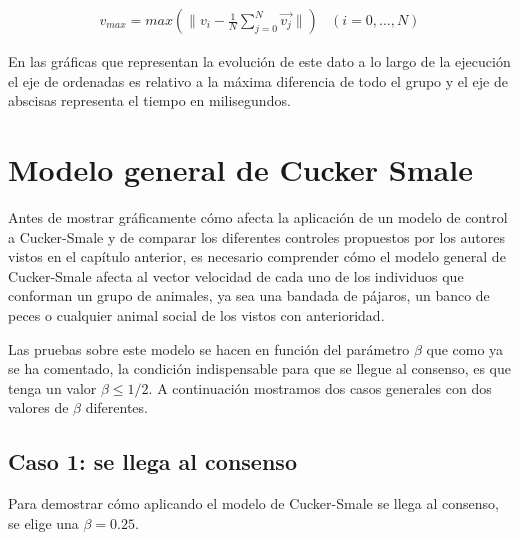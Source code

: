 \begin{equation}\label{eq:vmax}
    \begin{array}{l}
        v_{max} = \displaystyle{max(\|v_{i}-\frac{1}{N}\sum_{j=0}^{N}\vec{v_{j}}\|)}
    \end{array}
    \begin{array}{r}
        (i= 0, ..., N)
    \end{array}
\end{equation}

En las gráficas que representan la evolución de este dato a lo largo de la ejecución el eje de ordenadas es relativo a la máxima diferencia de todo el grupo y el eje de abscisas representa el tiempo en milisegundos.

\section{Modelo general de Cucker Smale} \label{s4_3}
Antes de mostrar gráficamente cómo afecta la aplicación de un modelo de control a Cucker-Smale y de comparar los diferentes controles propuestos por los autores vistos en el capítulo anterior, es necesario comprender cómo el modelo general de Cucker-Smale afecta al vector velocidad de cada uno de los individuos que conforman un grupo de animales, ya sea una bandada de pájaros, un banco de peces o cualquier animal social de los vistos con anterioridad. 

Las pruebas sobre este modelo se hacen en función del parámetro $\beta$ que como ya se ha comentado, la condición indispensable para que se llegue al consenso, es que tenga un valor $\beta \leq 1/2$. A continuación mostramos dos casos generales con dos valores de $\beta$ diferentes.

\subsection{Caso 1: se llega al consenso} \label{s4_3_1}
Para demostrar cómo aplicando el modelo de Cucker-Smale se llega al consenso, se elige una $\beta = 0.25$. 


